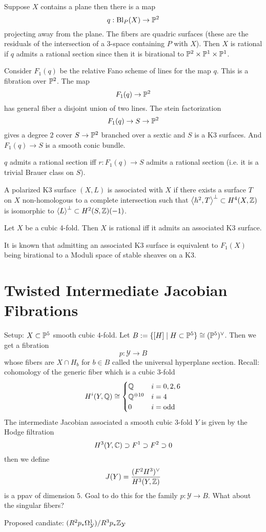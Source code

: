 \documentclass[12pt]{article}
\begin{document}
\begin{example}
Suppose $X$ contains a plane then there is a map
\[ q : \Bl_P(X) \to \P^2 \]
projecting away from the plane. The fibers are quadric surfaces (these are the residuals of the intersection of a $3$-space containing $P$ with $X$). Then $X$ is rational if $q$ admits a rational section since then it is birational to $\P^2 \times \P^1 \times \P^1$. 
\end{example}

Consider $F_1(q)$ be the relative Fano scheme of lines for the map $q$. This is a fibration over $\P^2$. The map
\[ F_1(q) \to \P^2 \]
has general fiber a disjoint union of two lines. The stein factorization
\[ F_1(q) \to S \to \P^2 \]
gives a degree $2$ cover $S \to \P^2$ branched over a sextic and $S$ is a K3 surfaces. And $F_1(q) \to S$ is a smooth conic bundle. 

\begin{prop}
$q$ admits a rational section iff $r : F_1(q) \to S$ admits a rational section (i.e. it is a trivial Brauer class on $S$). 
\end{prop} 

\begin{defn}
A polarized K3 surface $(X, L)$ is associated with $X$ if there exists a surface $T$ on $X$ non-homologous to a complete intersection such that $\left< h^2, T \right>^{\perp} \subset H^4(X, \ZZ)$ is isomorphic to $\left< L \right>^\perp \subset H^2(S, \Z)(-1)$.
\end{defn}

\begin{conj}
Let $X$ be a cubic 4-fold. Then $X$ is rational iff it admits an associated K3 surface. 
\end{conj}

It is known that admitting an associated K3 surface is equivalent to $F_1(X)$ being birational to a Moduli space of stable sheaves on a K3. 

\section{Twisted Intermediate Jacobian Fibrations}

\newcommand{\cY}{\mathcal{Y}}

Setup: $X \subset \P^5$ smooth cubic $4$-fold. Let $B := \{ [H] \mid H \subset \P^5 \} \cong (\P^5)^\vee$. Then we get a fibration
\[ p : \cY \to B \]
whose fibers are $X \cap H_b$ for $b \in B$ called the universal hyperplane section. Recall: cohomology of the generic fiber which is a cubic $3$-fold
\[ H^i(Y, \Q) \cong \begin{cases}
\Q & i = 0,2,6
\\
\Q^{\oplus 10} & i = 4
\\
0 & i = \text{odd}
\end{cases} \]
The intermediate Jacobian associated a smooth cubic $3$-fold $Y$ is given by the Hodge filtration
\[ H^3(Y, \CC) \supset F^1 \supset F^2 \supset 0 \]
then we define
\[ J(Y) = \frac{(F^2 H^3)^\vee}{H^3(Y, \ZZ)} \]
is a ppav of dimension $5$. Goal to do this for the family $p : \cY \to B$. What about the singular fibers? 
\par 
Proposed candiate: $(R^2 p_* \Omega_{\cY}^1) / R^3 p_* \Z_{\cY}$
\end{document}
